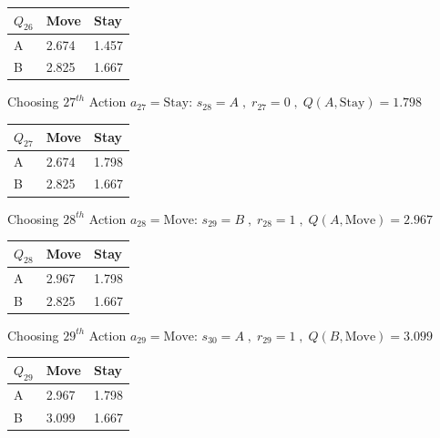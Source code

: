 \documentclass[a4paper]{article}
\theoremstyle{definition}
\newenvironment{soln}{
    \leavevmode\color{blue}\ignorespaces
}{}
\begin{document}
\begin{enumerate}
\begin{soln}
        \begin{center}
            \begin{tabular}{ | m{5em} | m{5em}| m{5em} |} 
            \hline
            $Q_{26}$ & Move & Stay \\ 
            \hline
            A & 2.674 & 1.457  \\
            \hline
            B & 2.825 & 1.667 \\ 
            \hline
            \end{tabular}
        \end{center}
Choosing $27^{th}$ Action $a_{27} = \text{Stay}$: $s_{28}=A\;,\;r_{27}=0\;,\;Q(A,\text{Stay}) = 1.798$
        \begin{center}
            \begin{tabular}{ | m{5em} | m{5em}| m{5em} |} 
            \hline
            $Q_{27}$ & Move & Stay \\ 
            \hline
            A & 2.674 & 1.798  \\
            \hline
            B & 2.825 & 1.667 \\ 
            \hline
            \end{tabular}
        \end{center}
Choosing $28^{th}$ Action $a_{28} = \text{Move}$: $s_{29}=B\;,\;r_{28}=1\;,\;Q(A,\text{Move}) = 2.967$
        \begin{center}
            \begin{tabular}{ | m{5em} | m{5em}| m{5em} |} 
            \hline
            $Q_{28}$ & Move & Stay \\ 
            \hline
            A & 2.967 & 1.798  \\
            \hline
            B & 2.825 & 1.667 \\ 
            \hline
            \end{tabular}
        \end{center}
Choosing $29^{th}$ Action $a_{29} = \text{Move}$: $s_{30}=A\;,\;r_{29}=1\;,\;Q(B,\text{Move}) = 3.099$
        \begin{center}
            \begin{tabular}{ | m{5em} | m{5em}| m{5em} |} 
            \hline
            $Q_{29}$ & Move & Stay \\ 
            \hline
            A & 2.967 & 1.798  \\
            \hline
            B & 3.099 & 1.667 \\ 
            \hline
            \end{tabular}

\end{center}
\end{soln}
\end{enumerate}
\end{document}
